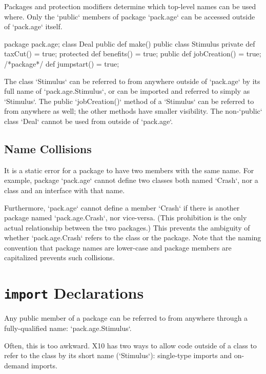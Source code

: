 Packages and protection modifiers determine which top-level names can be used
where. Only the \xcd`public` members of package \xcd`pack.age` can be accessed
outside of \xcd`pack.age` itself.  
% 
\begin{xten}
package pack.age;
class Deal {
  public def make() {}
}
public class Stimulus {
  private def taxCut() = true;
  protected def benefits() = true;
  public def jobCreation() = true;
  /*package*/ def jumpstart() = true;
}
\end{xten}
%

The class \xcd`Stimulus` can be referred to from anywhere outside of
\xcd`pack.age` by its full name of \xcd`pack.age.Stimulus`, or can be imported
and referred to simply as \xcd`Stimulus`.  The public \xcd`jobCreation()`
method of a \xcd`Stimulus` can be referred to from anywhere as well; the other
methods have smaller visibility.  The non-\xcd`public` class \xcd`Deal` cannot
be used from outside of \xcd`pack.age`.  



\subsection{Name Collisions}

It is a static error for a package to have two members with the same name. For
example, package \xcd`pack.age` cannot define two classes both named
\xcd`Crash`, nor a class and an interface with that name.

Furthermore, \xcd`pack.age` cannot define a member \xcd`Crash` if there is
another package named \xcd`pack.age.Crash`, nor vice-versa. (This prohibition
is the only actual relationship between the two packages.)  This prevents the
ambiguity of whether \xcd`pack.age.Crash` refers to the class or the package.  
Note that the naming convention that package names are lower-case and package
members are capitalized prevents such collisions.


\section{{\tt import} Declarations}
\label{sect:ImportDecl}

Any public member of a package can be referred to from anywhere through a
fully-qualified name: \xcd`pack.age.Stimulus`.    

Often, this is too awkward.  X10 has two ways to allow code outside of a class
to refer to the class by its short name (\xcd`Stimulus`): single-type imports
and on-demand imports.   

